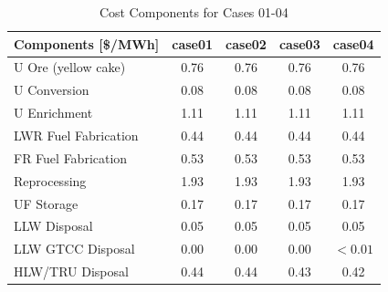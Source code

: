 \begin{table}[htbp]
\begin{center}
\caption{Cost Components for Cases 01-04}
\label{ses_table13_0}
\begin{tabular}{|l|c|c|c|c|}
\hline
\textbf{Components [\$/MWh]} & \textbf{case01} & \textbf{case02} & \textbf{case03} & \textbf{case04} \\
\hline
U Ore (yellow cake)          & 0.76            & 0.76            & 0.76            & 0.76 \\
U Conversion                 & 0.08            & 0.08            & 0.08            & 0.08 \\
U Enrichment                 & 1.11            & 1.11            & 1.11            & 1.11 \\
LWR Fuel Fabrication         & 0.44            & 0.44            & 0.44            & 0.44 \\
FR Fuel Fabrication          & 0.53            & 0.53            & 0.53            & 0.53 \\
Reprocessing                 & 1.93            & 1.93            & 1.93            & 1.93 \\
UF Storage                   & 0.17            & 0.17            & 0.17            & 0.17 \\
LLW Disposal                 & 0.05            & 0.05            & 0.05            & 0.05 \\
LLW GTCC Disposal            & 0.00            & 0.00            & 0.00            & $<0.01$ \\
HLW/TRU Disposal             & 0.44            & 0.44            & 0.43            & 0.42 \\
\hline
\end{tabular}
\end{center}
\end{table}


